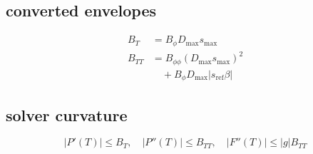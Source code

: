 \subsection*{converted envelopes}
\[
\displaystyle \begin{aligned}B_T&=B_\phi D_{\max}s_{\max}\\B_{TT}&=B_{\phi\phi}(D_{\max}s_{\max})^2\\&\quad+B_\phi D_{\max}|s_{\mathrm{ref}}\beta|\end{aligned}
\]

\subsection*{solver curvature}
\[
\displaystyle |P'(T)|\le B_T,\quad|P''(T)|\le B_{TT},\quad|F''(T)|\le |g|B_{TT}
\]
